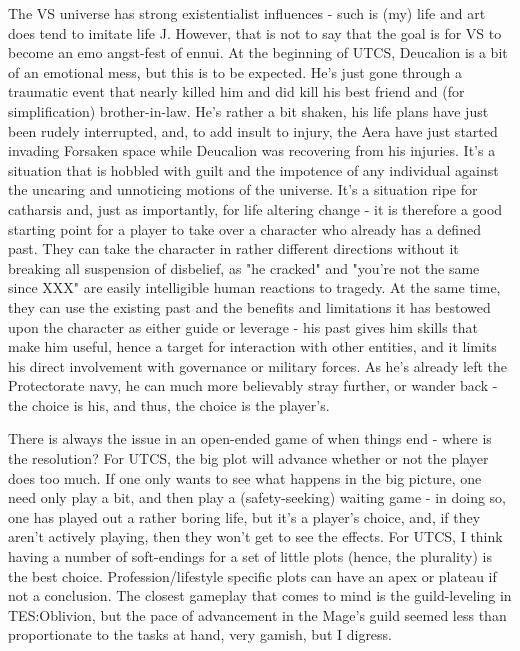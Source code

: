 The VS universe has strong existentialist influences - such is (my)
life and art does tend to imitate life J. However, that is not to say
that the goal is for VS to become an emo angst-fest of ennui. At the
beginning of UTCS, Deucalion is a bit of an emotional mess, but this
is to be expected. He's just gone through a traumatic event that
nearly killed him and did kill his best friend and (for
simplification) brother-in-law. He's rather a bit shaken, his life
plans have just been rudely interrupted, and, to add insult to injury,
the Aera have just started invading Forsaken space while Deucalion was
recovering from his injuries. It's a situation that is hobbled with
guilt and the impotence of any individual against the uncaring and
unnoticing motions of the universe. It's a situation ripe for
catharsis and, just as importantly, for life altering change - it is
therefore a good starting point for a player to take over a character
who already has a defined past. They can take the character in rather
different directions without it breaking all suspension of disbelief,
as "he cracked" and "you're not the same since XXX" are easily
intelligible human reactions to tragedy. At the same time, they can
use the existing past and the benefits and limitations it has bestowed
upon the character as either guide or leverage - his past gives him
skills that make him useful, hence a target for interaction with other
entities, and it limits his direct involvement with governance or
military forces. As he's already left the Protectorate navy, he can
much more believably stray further, or wander back - the choice is
his, and thus, the choice is the player's.

There is always the issue in an open-ended game of when things end -
where is the resolution? For UTCS, the big plot will advance whether
or not the player does too much. If one only wants to see what happens
in the big picture, one need only play a bit, and then play a
(safety-seeking) waiting game - in doing so, one has played out a
rather boring life, but it's a player's choice, and, if they aren't
actively playing, then they won't get to see the effects.  For UTCS, I
think having a number of soft-endings for a set of little plots
(hence, the plurality) is the best choice. Profession/lifestyle
specific plots can have an apex or plateau if not a conclusion. The
closest gameplay that comes to mind is the guild-leveling in
TES:Oblivion, but the pace of advancement in the Mage's guild seemed
less than proportionate to the tasks at hand, very gamish, but I
digress.
 
